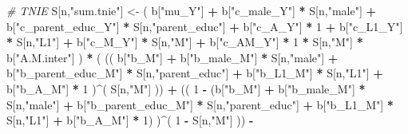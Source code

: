 \documentclass[
]{book}
\newenvironment{Shaded}{\begin{snugshade}}{\end{snugshade}}
\newcommand{\CommentTok}[1]{\textcolor[rgb]{0.56,0.35,0.01}{\textit{#1}}}
\newcommand{\DecValTok}[1]{\textcolor[rgb]{0.00,0.00,0.81}{#1}}
\newcommand{\NormalTok}[1]{#1}
\newcommand{\OtherTok}[1]{\textcolor[rgb]{0.56,0.35,0.01}{#1}}
\newcommand{\SpecialCharTok}[1]{\textcolor[rgb]{0.81,0.36,0.00}{\textbf{#1}}}
\newcommand{\StringTok}[1]{\textcolor[rgb]{0.31,0.60,0.02}{#1}}
\begin{document}
\begin{Shaded}
\begin{Highlighting}[]
    \CommentTok{\# TNIE }
\NormalTok{    S[n,}\StringTok{"sum.tnie"}\NormalTok{] }\OtherTok{\textless{}{-}}\NormalTok{ ( b[}\StringTok{"mu\_Y"}\NormalTok{] }\SpecialCharTok{+} 
\NormalTok{                           b[}\StringTok{"c\_male\_Y"}\NormalTok{] }\SpecialCharTok{*}\NormalTok{ S[n,}\StringTok{"male"}\NormalTok{] }\SpecialCharTok{+} 
\NormalTok{                           b[}\StringTok{"c\_parent\_educ\_Y"}\NormalTok{] }\SpecialCharTok{*}\NormalTok{ S[n,}\StringTok{"parent\_educ"}\NormalTok{] }\SpecialCharTok{+} 
\NormalTok{                           b[}\StringTok{"c\_A\_Y"}\NormalTok{] }\SpecialCharTok{*} \DecValTok{1} \SpecialCharTok{+} 
\NormalTok{                           b[}\StringTok{"c\_L1\_Y"}\NormalTok{] }\SpecialCharTok{*}\NormalTok{ S[n,}\StringTok{"L1"}\NormalTok{] }\SpecialCharTok{+}
\NormalTok{                           b[}\StringTok{"c\_M\_Y"}\NormalTok{] }\SpecialCharTok{*}\NormalTok{ S[n,}\StringTok{"M"}\NormalTok{] }\SpecialCharTok{+}
\NormalTok{                           b[}\StringTok{"c\_AM\_Y"}\NormalTok{] }\SpecialCharTok{*} \DecValTok{1} \SpecialCharTok{*}\NormalTok{ S[n,}\StringTok{"M"}\NormalTok{] }\SpecialCharTok{*}\NormalTok{ b[}\StringTok{"A.M.inter"}\NormalTok{] ) }\SpecialCharTok{*}
\NormalTok{      ( (( b[}\StringTok{"b\_M"}\NormalTok{] }\SpecialCharTok{+} 
\NormalTok{             b[}\StringTok{"b\_male\_M"}\NormalTok{] }\SpecialCharTok{*}\NormalTok{ S[n,}\StringTok{"male"}\NormalTok{] }\SpecialCharTok{+} 
\NormalTok{             b[}\StringTok{"b\_parent\_educ\_M"}\NormalTok{] }\SpecialCharTok{*}\NormalTok{ S[n,}\StringTok{"parent\_educ"}\NormalTok{] }\SpecialCharTok{+} 
\NormalTok{             b[}\StringTok{"b\_L1\_M"}\NormalTok{] }\SpecialCharTok{*}\NormalTok{ S[n,}\StringTok{"L1"}\NormalTok{] }\SpecialCharTok{+}
\NormalTok{             b[}\StringTok{"b\_A\_M"}\NormalTok{] }\SpecialCharTok{*} \DecValTok{1}\NormalTok{ )}\SpecialCharTok{\^{}}\NormalTok{( S[n,}\StringTok{"M"}\NormalTok{] )) }\SpecialCharTok{+}
\NormalTok{          (( }\DecValTok{1} \SpecialCharTok{{-}}\NormalTok{ (b[}\StringTok{"b\_M"}\NormalTok{] }\SpecialCharTok{+} 
\NormalTok{                    b[}\StringTok{"b\_male\_M"}\NormalTok{] }\SpecialCharTok{*}\NormalTok{ S[n,}\StringTok{"male"}\NormalTok{] }\SpecialCharTok{+} 
\NormalTok{                    b[}\StringTok{"b\_parent\_educ\_M"}\NormalTok{] }\SpecialCharTok{*}\NormalTok{ S[n,}\StringTok{"parent\_educ"}\NormalTok{] }\SpecialCharTok{+} 
\NormalTok{                    b[}\StringTok{"b\_L1\_M"}\NormalTok{] }\SpecialCharTok{*}\NormalTok{ S[n,}\StringTok{"L1"}\NormalTok{] }\SpecialCharTok{+}
\NormalTok{                    b[}\StringTok{"b\_A\_M"}\NormalTok{] }\SpecialCharTok{*} \DecValTok{1}\NormalTok{) )}\SpecialCharTok{\^{}}\NormalTok{( }\DecValTok{1} \SpecialCharTok{{-}}\NormalTok{ S[n,}\StringTok{"M"}\NormalTok{] )) }\SpecialCharTok{{-}}

\end{Highlighting}
\end{Shaded}
\end{document}
